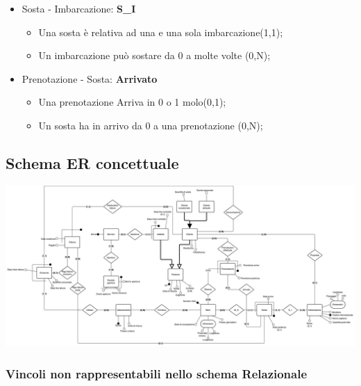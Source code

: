 \begin{itemize}
    \item Sosta - Imbarcazione: \textbf{S\_I}
    \begin{itemize}
        \item Una sosta è relativa ad una e una sola imbarcazione(1,1);
        \item Un imbarcazione può sostare da 0 a molte volte (0,N);
    \end{itemize}

    \item Prenotazione - Sosta: \textbf{Arrivato}
    \begin{itemize}
        \item Una prenotazione Arriva in 0 o 1 molo(0,1);
        \item Un sosta ha in arrivo da 0 a una prenotazione (0,N);
    \end{itemize}
    
\end{itemize}

\subsection{Schema ER concettuale}
\includegraphics[width=\textwidth]{img/erconcettuale.png}

\subsubsection{Vincoli non rappresentabili nello schema Relazionale}

